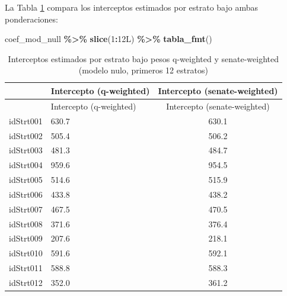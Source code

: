 \documentclass[
  spanish,
  12pt,
]{book}
\newenvironment{Shaded}{\begin{snugshade}}{\end{snugshade}}
\newcommand{\DataTypeTok}[1]{\textcolor[rgb]{0.13,0.29,0.53}{#1}}
\newcommand{\DecValTok}[1]{\textcolor[rgb]{0.00,0.00,0.81}{#1}}
\newcommand{\FunctionTok}[1]{\textcolor[rgb]{0.13,0.29,0.53}{\textbf{#1}}}
\newcommand{\NormalTok}[1]{#1}
\newcommand{\OtherTok}[1]{\textcolor[rgb]{0.56,0.35,0.01}{#1}}
\newcommand{\SpecialCharTok}[1]{\textcolor[rgb]{0.81,0.36,0.00}{\textbf{#1}}}
\newcommand{\StringTok}[1]{\textcolor[rgb]{0.31,0.60,0.02}{#1}}
\begin{document}
La Tabla \ref{tab:tab-interceptos-nulos} compara los interceptos estimados por estrato bajo ambas ponderaciones:

\begin{Shaded}
\end{Shaded}

\begin{Shaded}
\begin{Highlighting}[]
\NormalTok{coef\_mod\_null }\SpecialCharTok{\%\textgreater{}\%} \FunctionTok{slice}\NormalTok{(}\DecValTok{1}\SpecialCharTok{:}\DecValTok{12}\DataTypeTok{L}\NormalTok{) }\SpecialCharTok{\%\textgreater{}\%} \FunctionTok{tabla\_fmt}\NormalTok{()}
\end{Highlighting}
\end{Shaded}

\begin{longtable}[]{@{}llc@{}}
\caption{\label{tab:tab-interceptos-nulos}Interceptos estimados por estrato bajo pesos q-weighted y senate-weighted (modelo nulo, primeros 12 estratos)}\tabularnewline
\toprule\noalign{}
& Intercepto (q-weighted) & Intercepto (senate-weighted) \\
\midrule\noalign{}
\endfirsthead
\toprule\noalign{}
& Intercepto (q-weighted) & Intercepto (senate-weighted) \\
\midrule\noalign{}
\endhead
\bottomrule\noalign{}
\endlastfoot
idStrt001 & 630.7 & 630.1 \\
idStrt002 & 505.4 & 506.2 \\
idStrt003 & 481.3 & 484.7 \\
idStrt004 & 959.6 & 954.5 \\
idStrt005 & 514.6 & 515.9 \\
idStrt006 & 433.8 & 438.2 \\
idStrt007 & 467.5 & 470.5 \\
idStrt008 & 371.6 & 376.4 \\
idStrt009 & 207.6 & 218.1 \\
idStrt010 & 591.6 & 592.1 \\
idStrt011 & 588.8 & 588.3 \\
idStrt012 & 352.0 & 361.2 \\
\end{longtable}
\end{document}
